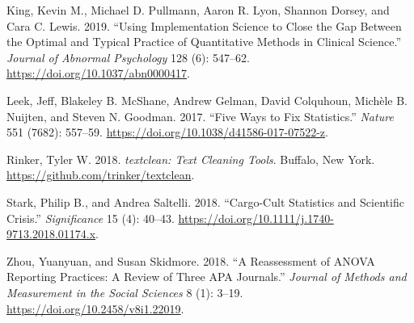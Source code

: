 \documentclass[
]{article}
\begin{document}
\leavevmode\hypertarget{ref-King2019}{}%
King, Kevin M., Michael D. Pullmann, Aaron R. Lyon, Shannon Dorsey, and
Cara C. Lewis. 2019. ``Using Implementation Science to Close the Gap
Between the Optimal and Typical Practice of Quantitative Methods in
Clinical Science.'' \emph{Journal of Abnormal Psychology} 128 (6):
547--62. \url{https://doi.org/10.1037/abn0000417}.

\leavevmode\hypertarget{ref-Leek2017}{}%
Leek, Jeff, Blakeley B. McShane, Andrew Gelman, David Colquhoun, Michèle
B. Nuijten, and Steven N. Goodman. 2017. ``Five Ways to Fix
Statistics.'' \emph{Nature} 551 (7682): 557--59.
\url{https://doi.org/10.1038/d41586-017-07522-z}.

\leavevmode\hypertarget{ref-textclean}{}%
Rinker, Tyler W. 2018. \emph{textclean: Text Cleaning Tools}. Buffalo,
New York. \url{https://github.com/trinker/textclean}.

\leavevmode\hypertarget{ref-Stark2018}{}%
Stark, Philip B., and Andrea Saltelli. 2018. ``Cargo-Cult Statistics and
Scientific Crisis.'' \emph{Significance} 15 (4): 40--43.
\url{https://doi.org/10.1111/j.1740-9713.2018.01174.x}.

\leavevmode\hypertarget{ref-Zhou2018}{}%
Zhou, Yuanyuan, and Susan Skidmore. 2018. ``A Reassessment of ANOVA
Reporting Practices: A Review of Three APA Journals.'' \emph{Journal of
Methods and Measurement in the Social Sciences} 8 (1): 3--19.
\url{https://doi.org/10.2458/v8i1.22019}.
\end{document}
